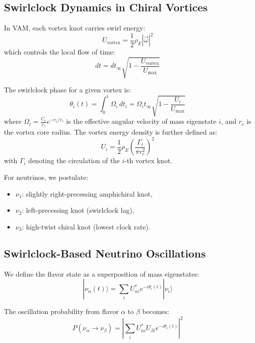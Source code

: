 \documentclass[preprint]{revtex4-2}
\begin{document}
\subsection{Swirlclock Dynamics in Chiral Vortices}

In VAM, each vortex knot carries swirl energy:
\begin{equation}
U_\text{vortex} = \frac{1}{2} \rho_{\scriptscriptstyle\boldsymbol\!E} |\vec{\omega}|^2
\end{equation}
which controls the local flow of time:
\begin{equation}
dt = dt_\infty \sqrt{1 - \frac{U_\text{vortex}}{U_\text{max}}}
\end{equation}

The swirlclock phase for a given vortex is:
\begin{equation}
\theta_i(t) = \int_0^t \Omega_i \, dt_i = \Omega_i t_\infty \sqrt{1 - \frac{U_i}{U_\text{max}}}
\end{equation}
where \( \Omega_i = \frac{C_e}{r_c} e^{-r_i/r_c} \) is the effective angular velocity of mass eigenstate \( i \), and \( r_c \) is the vortex core radius. The vortex energy density is further defined as:
\begin{equation}
U_i = \frac{1}{2} \rho_{\scriptscriptstyle\boldsymbol\!E}\left( \frac{\Gamma_i}{\pi r_c^2} \right)^2
\end{equation}
with \( \Gamma_i \) denoting the circulation of the \( i \)-th vortex knot.

For neutrinos, we postulate:
\begin{itemize}
\item \( \nu_1 \): slightly right-precessing amphichiral knot,
\item \( \nu_2 \): left-precessing knot (swirlclock lag),
\item \( \nu_3 \): high-twist chiral knot (lowest clock rate).
\end{itemize}

\subsection{Swirlclock-Based Neutrino Oscillations}

We define the flavor state as a superposition of mass eigenstates:
\begin{equation}
|\nu_\alpha(t)\rangle = \sum_i U_{\alpha i}^* e^{-i\theta_i(t)} |\nu_i\rangle
\end{equation}

The oscillation probability from flavor \( \alpha \) to \( \beta \) becomes:
\begin{equation}
P(\nu_\alpha \rightarrow \nu_\beta) = \left| \sum_i U_{\alpha i}^* U_{\beta i} e^{-i\theta_i(t)} \right|^2
\end{equation}
\end{document}
